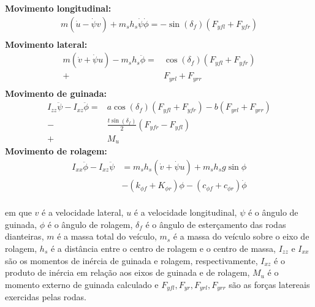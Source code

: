 \noindent\textbf{Movimento longitudinal:}
    \begin{equation}
    \label{eq:model}
    \begin{split}
        m\left(\dot{u} - \dot{\psi} v \right) + m_sh_s\dot{\psi}\dot{\phi} = 
    	-\sin(\delta_f)( F_{yfl} + F_{yfr} )  
    	\\
    \end{split}
    \end{equation}
\noindent\textbf{Movimento lateral:} 
    \begin{equation}
    \label{eq:model}
    \begin{split}
    	m\left(\dot{v} + \dot{\psi} u \right) - m_sh_s\ddot{\phi} =& 
    	\cos(\delta_f)( F_{yfl} + F_{yfr} )\\ +&  F_{yrl} +  F_{yrr} \\
    \end{split}
    \end{equation}
\noindent\textbf{Movimento de guinada:} 
    \begin{equation}
    \label{eq:model}
    \begin{split}
        I_{zz}\ddot{\psi} - I_{xz}\ddot{\phi} = 
          &   a\cos(\delta_f)(F_{yfl} + F_{yfr}) - b(F_{yrl} + F_{yrr}) \\
        - & \frac{t\sin(\delta_f)}{2}(F_{yfr} - F_{yfl} ) \\
        + & M_{u}
    \end{split}
    \end{equation}
\noindent\textbf{Movimento de rolagem:}
\begin{equation}
\label{eq:model}
\begin{split}
    I_{xx}\ddot{\phi} - I_{xz}\ddot{\psi} & = m_sh_s(\dot{v} +
    \dot{\psi}u) + m_sh_sg\sin\phi \\
    &- (k_{\phi f} +  K_{\phi r})\phi - (c_{\phi f} + c_{\phi r})\dot{\phi} \\
 \end{split}        
\end{equation}

\noindent em que $v$ é a velocidade lateral, $u$ é a velocidade longitudinal,
$\psi$ é o ângulo de guinada, $\phi$ é o ângulo de rolagem, $\delta_f$ é o
ângulo de esterçamento das rodas dianteiras, $m$ é a massa total do veículo, 
$m_s$ é a massa do veículo sobre o eixo de rolagem, $h_s$ é a distância entre o
centro de rolagem e o centro de massa, $I_{zz}$ e $I_{xx}$ são os momentos de inércia de guinada e rolagem, respectivamente,
$I_{xz}$ é o produto de inércia em relação aos eixos de guinada e de rolagem,
$M_u$ é o momento externo de guinada calculado e
$F_{yfl},F_{yr},F_{yrl},F_{yrr}$ são as forças latereais exercidas pelas rodas.


